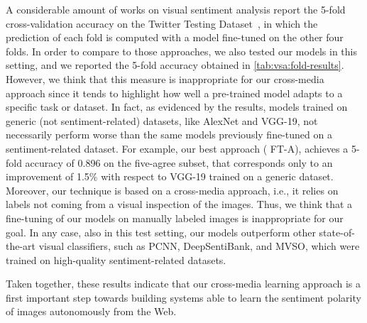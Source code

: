 A considerable amount of works on visual sentiment analysis report the 5-fold cross-validation accuracy on the Twitter Testing Dataset~\cite{campos2017pixels,islam2016visual,li2018image,you2015robust}, in which the prediction of each fold is computed with a model fine-tuned on the other four folds.
In order to compare to those approaches, we also tested our models in this setting, and we reported the 5-fold accuracy obtained in \ref{tab:vsa:fold-results}.
However, we think that this measure is inappropriate for our cross-media approach since it tends to highlight how well a pre-trained model adapts to a specific task or dataset.
In fact, as evidenced by the results, models trained on generic (not sentiment-related) datasets, like AlexNet and VGG-19, not necessarily perform worse than the same models previously fine-tuned on a sentiment-related dataset.
For example, our best approach ({\ourFtVGG} FT-A), achieves a 5-fold accuracy of 0.896 on the five-agree subset, that corresponds only to an improvement of 1.5\% with respect to VGG-19 trained on a generic dataset.
Moreover, our technique is based on a cross-media approach, i.e., it relies on labels not coming from a visual inspection of the images.
Thus, we think that a fine-tuning of our models on manually labeled images is inappropriate for our goal.
In any case, also in this test setting, our models outperform other state-of-the-art visual classifiers, such as PCNN, DeepSentiBank, and MVSO, which were trained on high-quality sentiment-related datasets.

Taken together, these results indicate that our cross-media learning approach is a first important step towards building systems able to learn the sentiment polarity of images autonomously from the Web.

